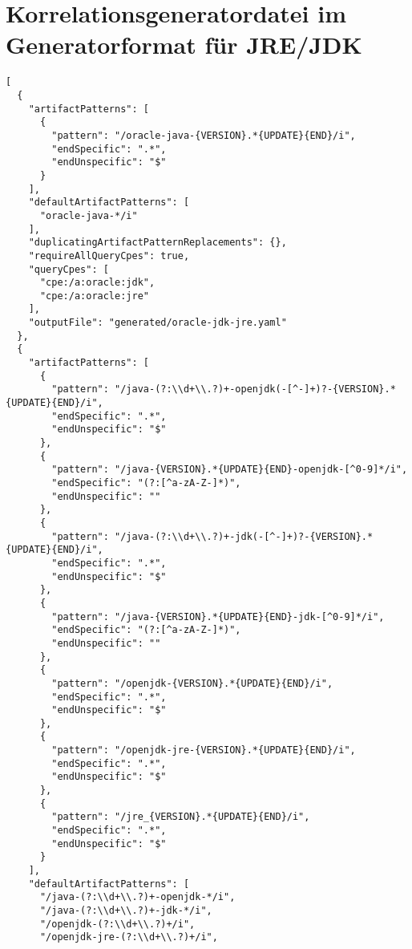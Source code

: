 \chapter{Korrelationsgeneratordatei im Generatorformat für JRE/JDK}\label{ch:generatorformat-jre-jdk}

\begin{lstlisting}[style=json,caption={Korrelationsgeneratordatei im Generatorformat für JRE/JDK},label={lst:correlation-generator-format-cpe-jre-jdk},basicstyle=\ttfamily\scriptsize]
[
  {
    "artifactPatterns": [
      {
        "pattern": "/oracle-java-{VERSION}.*{UPDATE}{END}/i",
        "endSpecific": ".*",
        "endUnspecific": "$"
      }
    ],
    "defaultArtifactPatterns": [
      "oracle-java-*/i"
    ],
    "duplicatingArtifactPatternReplacements": {},
    "requireAllQueryCpes": true,
    "queryCpes": [
      "cpe:/a:oracle:jdk",
      "cpe:/a:oracle:jre"
    ],
    "outputFile": "generated/oracle-jdk-jre.yaml"
  },
  {
    "artifactPatterns": [
      {
        "pattern": "/java-(?:\\d+\\.?)+-openjdk(-[^-]+)?-{VERSION}.*{UPDATE}{END}/i",
        "endSpecific": ".*",
        "endUnspecific": "$"
      },
      {
        "pattern": "/java-{VERSION}.*{UPDATE}{END}-openjdk-[^0-9]*/i",
        "endSpecific": "(?:[^a-zA-Z-]*)",
        "endUnspecific": ""
      },
      {
        "pattern": "/java-(?:\\d+\\.?)+-jdk(-[^-]+)?-{VERSION}.*{UPDATE}{END}/i",
        "endSpecific": ".*",
        "endUnspecific": "$"
      },
      {
        "pattern": "/java-{VERSION}.*{UPDATE}{END}-jdk-[^0-9]*/i",
        "endSpecific": "(?:[^a-zA-Z-]*)",
        "endUnspecific": ""
      },
      {
        "pattern": "/openjdk-{VERSION}.*{UPDATE}{END}/i",
        "endSpecific": ".*",
        "endUnspecific": "$"
      },
      {
        "pattern": "/openjdk-jre-{VERSION}.*{UPDATE}{END}/i",
        "endSpecific": ".*",
        "endUnspecific": "$"
      },
      {
        "pattern": "/jre_{VERSION}.*{UPDATE}{END}/i",
        "endSpecific": ".*",
        "endUnspecific": "$"
      }
    ],
    "defaultArtifactPatterns": [
      "/java-(?:\\d+\\.?)+-openjdk-*/i",
      "/java-(?:\\d+\\.?)+-jdk-*/i",
      "/openjdk-(?:\\d+\\.?)+/i",
      "/openjdk-jre-(?:\\d+\\.?)+/i",

\end{lstlisting}
